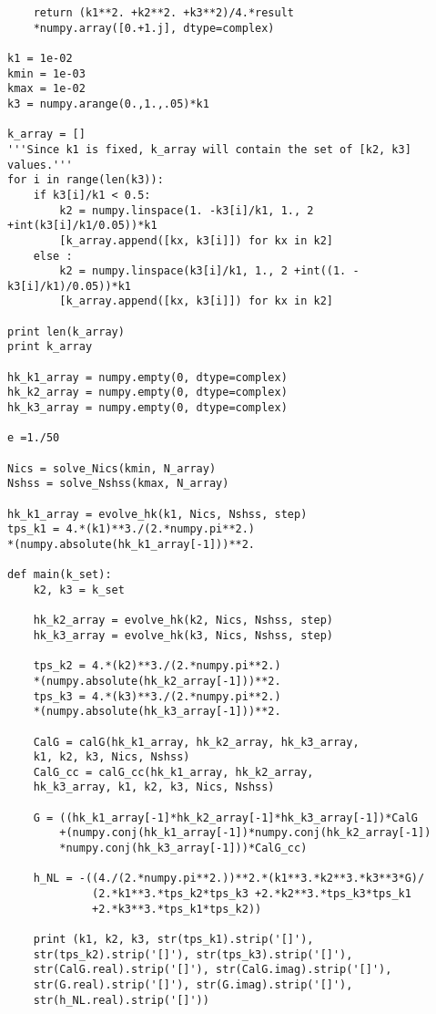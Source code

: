 \documentclass[12pt,a4paper,oneside]{book}
\begin{document}
\begin{appendices}
\begin{small}
\begin{verbatim}
    return (k1**2. +k2**2. +k3**2)/4.*result
    *numpy.array([0.+1.j], dtype=complex)

k1 = 1e-02
kmin = 1e-03
kmax = 1e-02
k3 = numpy.arange(0.,1.,.05)*k1

k_array = []
'''Since k1 is fixed, k_array will contain the set of [k2, k3] values.'''
for i in range(len(k3)):
    if k3[i]/k1 < 0.5:
        k2 = numpy.linspace(1. -k3[i]/k1, 1., 2 +int(k3[i]/k1/0.05))*k1
        [k_array.append([kx, k3[i]]) for kx in k2]
    else :
        k2 = numpy.linspace(k3[i]/k1, 1., 2 +int((1. -k3[i]/k1)/0.05))*k1
        [k_array.append([kx, k3[i]]) for kx in k2]

print len(k_array)
print k_array

hk_k1_array = numpy.empty(0, dtype=complex)
hk_k2_array = numpy.empty(0, dtype=complex)
hk_k3_array = numpy.empty(0, dtype=complex)

e =1./50

Nics = solve_Nics(kmin, N_array)
Nshss = solve_Nshss(kmax, N_array)

hk_k1_array = evolve_hk(k1, Nics, Nshss, step)
tps_k1 = 4.*(k1)**3./(2.*numpy.pi**2.)
*(numpy.absolute(hk_k1_array[-1]))**2.   

def main(k_set):
    k2, k3 = k_set

    hk_k2_array = evolve_hk(k2, Nics, Nshss, step)
    hk_k3_array = evolve_hk(k3, Nics, Nshss, step)

    tps_k2 = 4.*(k2)**3./(2.*numpy.pi**2.)
    *(numpy.absolute(hk_k2_array[-1]))**2.
    tps_k3 = 4.*(k3)**3./(2.*numpy.pi**2.)
    *(numpy.absolute(hk_k3_array[-1]))**2.
    
    CalG = calG(hk_k1_array, hk_k2_array, hk_k3_array, 
    k1, k2, k3, Nics, Nshss)
    CalG_cc = calG_cc(hk_k1_array, hk_k2_array, 
    hk_k3_array, k1, k2, k3, Nics, Nshss)

    G = ((hk_k1_array[-1]*hk_k2_array[-1]*hk_k3_array[-1])*CalG 
		+(numpy.conj(hk_k1_array[-1])*numpy.conj(hk_k2_array[-1])
		*numpy.conj(hk_k3_array[-1]))*CalG_cc)

    h_NL = -((4./(2.*numpy.pi**2.))**2.*(k1**3.*k2**3.*k3**3*G)/
             (2.*k1**3.*tps_k2*tps_k3 +2.*k2**3.*tps_k3*tps_k1 
             +2.*k3**3.*tps_k1*tps_k2))
   
    print (k1, k2, k3, str(tps_k1).strip('[]'), 
    str(tps_k2).strip('[]'), str(tps_k3).strip('[]'), 
    str(CalG.real).strip('[]'), str(CalG.imag).strip('[]'), 
    str(G.real).strip('[]'), str(G.imag).strip('[]'), 
    str(h_NL.real).strip('[]'))


\end{verbatim}
\end{small}
\end{appendices}
\end{document}
